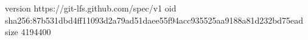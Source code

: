 version https://git-lfs.github.com/spec/v1
oid sha256:87b531dbd4ff11093d2a79ad51daee55f94acc935525aa9188a81d232bd75ead
size 4194400
